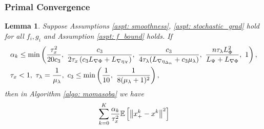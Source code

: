 \documentclass[10pt]{article}
\newtheorem{lemma}{Lemma}[section]
\theoremstyle{remark}
\newcommand{\cX}{\mathcal{X}}
\def\setF{\mathscr{F}} %
\newcommand{\E}{\mathbb{E}}
\newcommand{\norm}[1]{\left\|#1\right\|}
\begin{document}
\subsubsection{Primal Convergence}
\begin{lemma}\label{lem: primal}
    Suppose Assumptions \ref{aspt: smoothness}, \ref{aspt: stochastic_grad} hold for all $f_i, g_i$ and Assumption \ref{aspt: f_bound} holds. If
    \begin{align}
         &\alpha_k\leq \min\left(\frac{\tau_x^2}{20c_3},\ \frac{c_3}{2\tau_x\left(c_3L_{\nabla\Phi} + L_{\nabla\eta_{\cX}}\right)},\ \frac{c_3}{4\tau_{\lambda}(L_{\nabla\eta_{\Delta_n}} +c_3\mu_{\lambda})},\ \frac{n\tau_{\lambda}L_{\Phi}^2}{L_{\Psi} + L_{\nabla\Phi}},\ 1\right),\notag \\
        &\tau_x < 1,\ \tau_{\lambda} = \frac{1}{\mu_{\lambda}},\ c_3 \leq \min\left(\frac{1}{10},\ \frac{1}{8(\mu_{\lambda} + 1)^2}\right),\label{ineq: conditions_primal}
    \end{align}
    then in Algorithm \ref{algo: momasoba} we have
    \begin{align}
        &\sum_{k=0}^{K}\frac{\alpha_k}{\tau_x^2}\E\left[\norm{x_+^k-x^k}^2\right] \notag\\

\end{align}
\end{lemma}
\end{document}

